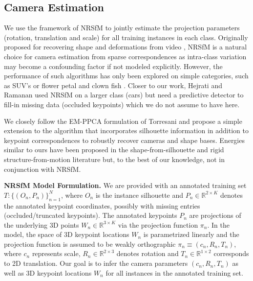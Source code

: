 \subsection{Camera Estimation}
We use the framework of NRSfM \cite{Bregler2000} to jointly estimate the projection parameters (rotation, translation and scale) for all training instances in each class. Originally proposed for recovering shape and deformations from video \cite{nrsfm_priors,Torresani2008NRSFM,varnrsfm2013,Bregler2000}, NRSfM is a natural choice for camera estimation from sparse correspondences as intra-class variation may become a confounding factor if not modeled explicitly. However, the performance of such algorithms has only been explored on simple categories, such as SUV's \cite{Zhu_ModelEvolution:2010} or flower petal and clown fish \cite{prasad2010finding}. Closer to our work, Hejrati and Ramanan \cite{HejratiR12} used NRSfM on a larger class (cars) but need a predictive detector to fill-in missing data (occluded keypoints) which we do not assume to have here.


We closely follow the EM-PPCA formulation of Torresani \etal\cite{Torresani2008NRSFM} and propose a simple extension to the algorithm that incorporates silhouette information in addition to keypoint correspondences to robustly recover cameras and shape bases. Energies similar to ours have been proposed in the shape-from-silhouette  \cite{balloonshapes} and rigid structure-from-motion \cite{carvi14} literature but, to the best of our knowledge, not in conjunction with NRSfM.

\vspace{3mm}
\noindent \textbf{NRSfM Model Formulation.} We are provided with an annotated training set $T:\{(O_n, P_n)\}_{n=1}^N$, where $O_n$ is the instance silhouette and $P_n \in \mathbb{R}^{2 \times K}$ denotes the annotated keypoint coordinates, possibly with missing entries (occluded/truncated keypoints). The annotated keypoints $P_n$ are  projections of the underlying 3D points $W_n \in \mathbb{R}^{3 \times K}$ via the projection function $\pi_n$. In the \nrsfm model, the space of 3D keypoint locations $W_n$ is parametrized linearly and the projection function is assumed to be weakly orthographic \ie $\pi_n \equiv (c_n, R_n, T_n)$, where $c_n$ represents scale, $R_n \in \mathbb{R}^{2 \times 3}$ denotes rotation and $T_n \in \mathbb{R}^{1 \times 2}$ corresponds to 2D translation. Our goal is to infer the camera parameters $(c_n, R_n, T_n)$ as well as 3D keypoint locations $W_n$ for all instances in the annotated training set.

